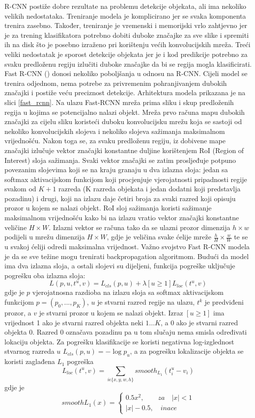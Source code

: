 R-CNN postiže dobre rezultate na problemu detekcije objekata, ali ima nekoliko velikih nedostataka. Treniranje modela je komplicirano jer se svaka komponenta trenira zasebno. Također, treniranje je vremenski i memorijski vrlo zahtjevno jer je za trening klasifikatora potrebno dobiti duboke značajke za sve slike i spremiti ih na disk što je posebno izraženo pri korištenju većih konvolucijskih mreža. Treći veliki nedostatak je sporost detekcije objekata jer je i kod predikcije potrebno za svaku predloženu regiju izlučiti duboke značajke da bi se regija mogla klasificirati.
Fast R-CNN (\cite{DBLP:journals/corr/Girshick15}) donosi nekoliko poboljšanja u odnosu na R-CNN. Cijeli model se trenira odjednom, nema potrebe za privremenim pohranjivanjem dubokih značajki i postiže veću preciznost detekcije.
Arhitektura modela prikazana je na slici \ref{fast_rcnn}. Na ulazu Fast-RCNN mreža prima sliku i skup predloženih regija u kojima se potencijalno nalazi objekt. Mreža prvo računa mapu dubokih značajki za cijelu sliku koristeći duboku konvolucijsku mrežu koja se sastoji od nekoliko konvolucijskih slojeva i nekoliko slojeva sažimanja maksimalnom vrijednošću. Nakon toga se, za svaku predloženu regiju, iz dobivene mape značajki izlučuje vektor značajki konstantne duljine korištenjem RoI (Region of Interest) sloja sažimanja. Svaki vektor značajki se zatim prosljeđuje potpuno povezanim slojevima koji se na kraju granaju u dva izlazna sloja: jedan sa softmax aktivacijskom funkcijom koji procjenjuje vjerojatnosti pripadnosti regije svakom od $K + 1$ razreda (K razreda objekata i jedan dodatni koji predstavlja pozadinu) i drugi, koji na izlazu daje četiri broja za svaki razred koji opisuju prozor u kojem se nalazi objekt. 
RoI sloj sažimanja koristi sažimanje maksimalnom vrijednošću kako bi na izlazu vratio vektor značajki konstantne veličine $H \times W$. Izlazni vektor se računa tako da se ulazni prozor dimenzija $h \times w$ podijeli u mrežu dimenzija $H \times W$, gdje je veličina svake ćelije mreže $\frac{h}{H} \times \frac{w}{W}$ te se u svakoj ćeliji odredi maksimalna vrijednost.
Važno svojstvo Fast R-CNN modela je da se sve težine mogu trenirati backpropagation algoritmom. Budući da model ima dva izlazna sloja, a ostali slojevi su dijeljeni, funkcija pogreške uključuje pogrešku oba izlazna sloja:
\[
L(p, u, t^u , v) = L_{cls}(p, u) + \lambda [u \geq 1]L_{loc}(t^u, v)
\]
gdje je $p$ vjerojatnosna razdioba na izlazu sloja sa softmax aktivacijskom funkcijom $p = (p_0, ..., p_K)$, $u$ je stvarni razred regije na ulazu, $t^k$ je predviđeni prozor, a $v$ je stvarni prozor u kojem se nalazi objekt. Izraz $[u \geq 1]$ ima vrijednost 1 ako je stvarni razred objekta neki $1...K$, a 0 ako je stvarni razred objekta 0. Razred 0 označava pozadinu pa u tom slučaju nema smisla određivati lokaciju objekta. Za pogrešku klasifikacije se koristi negativna log-izglednost stvarnog razreda $u$ $L_{cls}(p, u) = - \log p_u$, a za pogrešku lokalizacije objekta se koristi zaglađena $L_1$ pogreška
\[
L_{loc}(t^u, v) = \sum\limits_{i \epsilon \{ x, y, w, h \}} smooth_{L_1} (t^u_i - v_i)
\]
gdje je
\[
smooth{L_1}(x) = 
	\begin{cases}
		0.5x^2, \quad \quad za \quad |x| < 1 \\
		|x| - 0.5, \quad inace
	\end{cases}
\]

